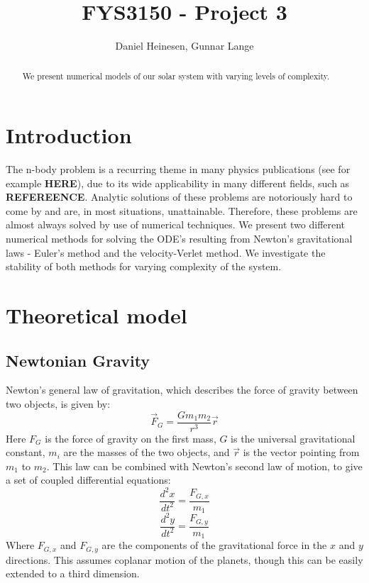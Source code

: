 \documentclass[a4paper, 10pt]{article}
\title{FYS3150 - Project 3}
\author{Daniel Heinesen, Gunnar Lange}
\begin{document}
\maketitle
\begin{abstract}
We present numerical models of our solar system with varying levels of complexity.
\end{abstract}

\tableofcontents
\newpage
\section{Introduction}
The n-body problem is a recurring theme in many physics publications (see for example \textbf{HERE}), due to its wide applicability in many different fields, such as \textbf{REFEREENCE}.  Analytic solutions of these problems are notoriously hard to come by and are, in most situations, unattainable. Therefore, these problems are almost always solved by use of numerical techniques. We present two different numerical methods for solving the ODE's resulting from Newton's gravitational laws - Euler's method and the velocity-Verlet method. We investigate the stability of both methods for varying complexity of the system.
\section{Theoretical model}\label{Theoretical_section}
\subsection{Newtonian Gravity}
Newton's general law of gravitation, which describes the force of gravity between two objects, is given by:
\begin{equation}
\vec{F}_{G}=\frac{Gm_1m_2}{r^3}\vec{r}
\end{equation}
Here $F_G$ is the force of gravity on the first mass, $G$ is the universal gravitational constant, $m_i$ are the masses of the two objects, and $\vec{r}$ is the vector pointing from $m_1$ to $m_2$. This law can be combined with Newton's second law of motion, to give a set of coupled differential equations:
\begin{equation}\label{eq:coupled_diff_1}
\frac{d^2x}{dt^2}=\frac{F_{G,x}}{m_1}
\end{equation} 
\begin{equation}\label{eq:coupled_diff_2}
\frac{d^2 y}{dt^2}=\frac{F_{G,y}}{m_1}
\end{equation}
Where $F_{G,x}$ and $F_{G,y}$ are the components of the gravitational force in the $x$ and $y$ directions. This assumes coplanar motion of the planets, though this can be easily extended to a third dimension.\\
\end{document}
